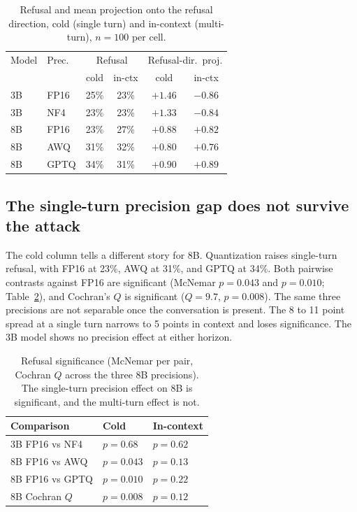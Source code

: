 \documentclass[11pt]{article}
\begin{document}
\begin{table}[t]
\centering
\begin{tabular}{llcccc}
\toprule
Model & Prec. & \multicolumn{2}{c}{Refusal} & \multicolumn{2}{c}{Refusal-dir.\ proj.} \\
& & cold & in-ctx & cold & in-ctx \\
\midrule
3B & FP16 & 25\% & 23\% & $+1.46$ & $-0.86$ \\
3B & NF4  & 23\% & 23\% & $+1.33$ & $-0.84$ \\
\midrule
8B & FP16 & 23\% & 27\% & $+0.88$ & $+0.82$ \\
8B & AWQ  & 31\% & 32\% & $+0.80$ & $+0.76$ \\
8B & GPTQ & 34\% & 31\% & $+0.90$ & $+0.89$ \\
\bottomrule
\end{tabular}
\caption{Refusal and mean projection onto the refusal direction, cold (single
turn) and in-context (multi-turn), $n=100$ per cell.}
\label{tab:means}
\end{table}

\subsection{The single-turn precision gap does not survive the attack}
The cold column tells a different story for 8B. Quantization raises single-turn
refusal, with FP16 at 23\%, AWQ at 31\%, and GPTQ at 34\%. Both pairwise contrasts
against FP16 are significant (McNemar $p=0.043$ and $p=0.010$; Table~\ref{tab:sig}),
and Cochran's $Q$ is significant ($Q=9.7$, $p=0.008$). The same three precisions
are not separable once the conversation is present. The 8 to 11 point spread at a
single turn narrows to 5 points in context and loses significance. The 3B model
shows no precision effect at either horizon.

\begin{table}[t]
\centering
\begin{tabular}{lll}
\toprule
Comparison & Cold & In-context \\
\midrule
3B FP16 vs NF4 & $p=0.68$ & $p=0.62$ \\
8B FP16 vs AWQ & $p=0.043$ & $p=0.13$ \\
8B FP16 vs GPTQ & $p=0.010$ & $p=0.22$ \\
8B Cochran $Q$ & $p=0.008$ & $p=0.12$ \\
\bottomrule
\end{tabular}
\caption{Refusal significance (McNemar per pair, Cochran $Q$ across the three 8B
precisions). The single-turn precision effect on 8B is significant, and the
multi-turn effect is not.}
\label{tab:sig}
\end{table}
\end{document}
